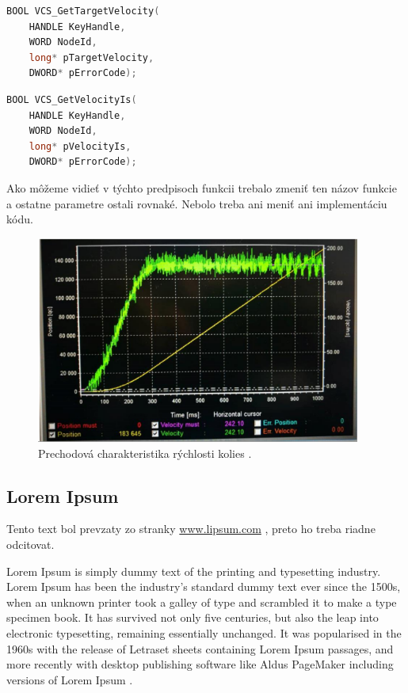 
\label{VelocityIs}
\begin{lstlisting}[language=C++]
BOOL VCS_GetTargetVelocity(
	HANDLE KeyHandle,
	WORD NodeId,
	long* pTargetVelocity,
	DWORD* pErrorCode);
\end{lstlisting}

\begin{lstlisting}[language=C++]
BOOL VCS_GetVelocityIs(
	HANDLE KeyHandle,
	WORD NodeId,
	long* pVelocityIs,
	DWORD* pErrorCode);
\end{lstlisting}

\noindent Ako môžeme vidieť v týchto predpisoch funkcii trebalo zmeniť ten názov funkcie a ostatne parametre ostali rovnaké.
Nebolo treba ani meniť ani implementáciu kódu.

\begin{figure}[!htbp]
	\begin{center}
		\includegraphics[width=0.95\textwidth]{img/robotSpeedChar.png}
	\end{center}
	\caption{Prechodová charakteristika rýchlosti kolies \cite{timovyProjekt}. }
	\label{fig:prechChar}
\end{figure}

\subsection{Lorem Ipsum}
Tento text bol prevzaty zo stranky \url{www.lipsum.com} \cite{lipsum}, preto ho treba riadne odcitovat.

Lorem Ipsum is simply dummy text of the printing and typesetting industry. Lorem Ipsum has been the industry's standard dummy text ever since the 1500s, when an unknown printer took a galley of type and scrambled it to make a type specimen book. It has survived not only five centuries, but also the leap into electronic typesetting, remaining essentially unchanged. It was popularised in the 1960s with the release of Letraset sheets containing Lorem Ipsum passages, and more recently with desktop publishing software like Aldus PageMaker including versions of Lorem Ipsum \cite{lipsum}.

